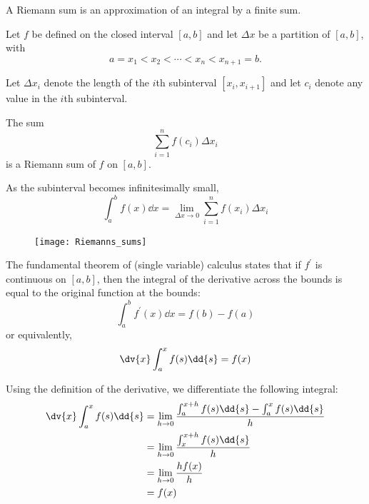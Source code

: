 A Riemann sum is an approximation of an integral by a finite sum.

Let $f$ be defined on the closed interval $[a,b]$ and let $\Delta x$ be a partition of $[a,b]$, with
\[ a=x_1 < x_2 < \cdots < x_n < x_{n+1}=b.\]

Let $\Delta x_i$ denote the length of the $i$th subinterval $[x_i,x_{i+1}]$ and let $c_i$ denote any value in the $i$th subinterval.

The sum
\[ \sum_{i=1}^n f(c_i)\Delta x_i\]
is a Riemann sum of $f$ on $[a,b]$.

As the subinterval becomes infinitesimally small, 
\[ \int _{a}^{b}f(x) \dd{x} = \lim _{\Delta x \to 0} \sum _{i=1}^{n} f(x_{i}) \Delta x_{i} \]

\begin{figure}[H]
	\centering
	\texttt{[image: Riemanns\_sums]}
\end{figure}

\begin{theorem}
The fundamental theorem of (single variable) calculus states that if $f^\prime$ is continuous on $[a,b]$, then the integral of the derivative across the bounds is equal to the original function at the bounds:
\begin{equation}
\int_a^b f^\prime(x) \dd{x} = f(b)-f(a)
\end{equation}
or equivalently,
\begin{equation}
\dv{x} \int_{a}^{x} f(s) \dd{s} = f(x)
\end{equation}
\end{theorem}


Using the definition of the derivative, we differentiate the following integral:
\begin{align*}
\dv{x} \int_{a}^{x} f(s) \dd{s} &= \lim_{h \to 0} \frac{\int_{a}^{x+h} f(s) \dd{s} - \int_{a}^{x} f(s) \dd{s}}{h}\\
&= \lim_{h \to 0} \frac{\int_{x}^{x+h} f(s) \dd{s}}{h}\\
&= \lim_{h \to 0} \frac{h f(x)}{h}\\
&= f(x)
\end{align*}

